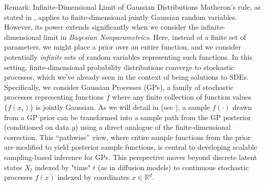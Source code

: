 \begin{lightgraybox}{Remark: Infinite-Dimensional Limit of Gaussian Distributions}
    Matheron's rule, as stated in , applies to finite-dimensional jointly Gaussian random variables. However, its power extends significantly when we consider the infinite-dimensional limit in \emph{Bayesian Nonparametrics}. Here, instead of a finite set of parameters, we might place a prior over an entire function, and we consider potentially \emph{infinite} sets of random variables representing such functions. In this setting, finite-dimensional probability distributions converge to stochastic processes, which we've already seen in the context of being solutions to SDEs. Specifically, we consider Gaussian Processes (GPs), a family of stochastic processes representing functions $f$ where any finite collection of function values $\{f(x_i)\}$ is jointly Gaussian. As we will detail in  (see ), a sample $f(\cdot)$ drawn from a GP prior can be transformed into a sample path from the GP posterior (conditioned on data $y$) using a direct analogue of the finite-dimensional correction. This ``pathwise'' view, where entire sample functions from the prior are modified to yield posterior sample functions, is central to developing scalable sampling-based inference for GPs. This perspective moves beyond discrete latent states $X_t$ indexed by "time" $t$ (as in diffusion models) to continuous stochastic processes $f(x)$ indexed by coordinates $x \in \mathbb{R}^d$.
\end{lightgraybox}

